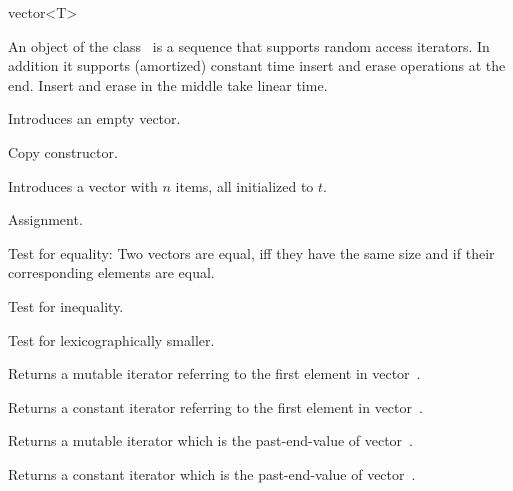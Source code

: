 
\ccHtmlNoClassLinks
\begin{ccClassTemplate} {vector<T>}


\ccDefinition
An object of the class \ccClassName\ is a sequence that supports
random access iterators. In addition it supports (amortized)
constant time insert and erase operations at the end.  Insert and erase 
in the middle take linear time.

\ccHtmlLinksOff
{}
\ccHtmlLinksOn

\ccTypes
{}



\ccCreation
{}

             {Introduces an empty vector.}

 	    {Copy constructor.}

            {Introduces a vector with $n$ items, all initialized to $t$.}


\ccOperations

        {Assignment.}


       {Test for equality: Two vectors are equal, iff they have the same size
        and if their corresponding elements are equal.}

       {Test for inequality.}

       {Test for lexicographically smaller.}


       {Returns a mutable iterator referring to the first element in
        vector~\ccVar.}

\renewcommand{\ccTagRmTrailingConst}{\ccFalse}
       {Returns a constant iterator referring to the first element in
        vector~\ccVar.}
\renewcommand{\ccTagRmTrailingConst}{\ccTrue}

       {Returns a mutable iterator which is the past-end-value of
        vector~\ccVar.}

\renewcommand{\ccTagRmTrailingConst}{\ccFalse}
       {Returns a constant iterator which is the past-end-value of 
        vector~\ccVar.}
\renewcommand{\ccTagRmTrailingConst}{\ccTrue}


\end{ccClassTemplate}
